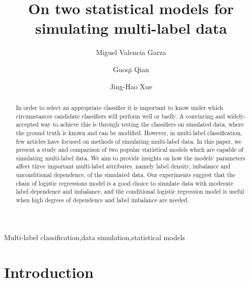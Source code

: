 \documentclass[review]{elsarticle}
\begin{document}
	
	\begin{frontmatter}
		
		\title{On two statistical models for simulating multi-label data}
		
		\author[UCL]{Miguel Valencia Garza}
		\author[MEL]{Guoqi Qian}
		\author[UCL]{Jing-Hao Xue}
		\address[UCL]{Department of Statistical Science, University College London, London WC1E 6BT, UK}
		\address[MEL]{School of Mathematics and Statistics, The University of Melbourne, Parkville VIC 3010, Australia}
		
		\begin{abstract}
			In order to select an appropriate classifier it is important to know under which circumstances candidate classifiers will perform well or badly. A convincing and widely-accepted way to achieve this is through testing the classifiers on simulated data, where the ground truth is known and can be modified. However, in multi-label classification, few articles have focused on methods of simulating multi-label data. In this paper, we present a study and comparison of two popular statistical models which are capable of simulating multi-label data. We aim to provide insights on how the models' parameters affect three important multi-label attributes, namely label density, imbalance and unconditional dependence, of the simulated data. Our experiments suggest that the chain of logistic regressions model is a good choice to simulate data with moderate label dependence and imbalance, and the conditional logistic regression model is useful when high degrees of dependence and label imbalance are needed. 
		\end{abstract}
		
		\begin{keyword}
			Multi-label classification\sep data simulation\sep statistical models
		\end{keyword}
		
	\end{frontmatter}
	
	\linenumbers
	
	
	\section{Introduction}
	\label{INTRO}
	
\end{document}
